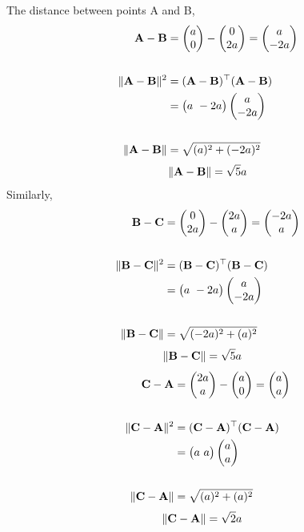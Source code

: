 \documentclass[journal,12pt,twocolumn]{IEEEtran}
\begin{document}
The distance between points A and B,
\vspace{0.3cm}
\begin{align*}
\mathbf{A} - \mathbf{B}&=\begin{pmatrix}a\\0\end{pmatrix}-\begin{pmatrix}0\\2a\end{pmatrix}=\begin{pmatrix}a\\-2a\end{pmatrix}\\\\
\lVert\mathbf{A}-\mathbf{B}\rVert^2 &=({\mathbf{A}-\mathbf{B}})^\top({\mathbf{A}-\mathbf{B}})\\
&= \begin{pmatrix}a \ -2a\end{pmatrix} \begin{pmatrix}a\\-2a\end{pmatrix}\\\\
\lVert\mathbf{A}-\mathbf{B}\rVert&=\sqrt{(a)^2+(-2a)^2}
\end{align*}
\begin{align}
 \lVert \mathbf{A}-\mathbf{B}\rVert=\sqrt{5}a   \label{Eq:1}
\end{align}
Similarly, 
\begin{align*}
\mathbf{B} - \mathbf{C}&=\begin{pmatrix}0\\2a\end{pmatrix}-\begin{pmatrix}2a\\a\end{pmatrix}=\begin{pmatrix}-2a\\a\end{pmatrix}\\\\
\lVert\mathbf{B}-\mathbf{C}\rVert^2&=({\mathbf{B}-\mathbf{C}})^\top({\mathbf{B}-\mathbf{C}})\\&= \begin{pmatrix}a \ -2a\end{pmatrix} \begin{pmatrix}a\\-2a\end{pmatrix}\\\\
\lVert\mathbf{B}-\mathbf{C}\rVert&=\sqrt{(-2a)^2+(a)^2}
\end{align*}
\begin{align}
    \lVert \mathbf{B} - \mathbf{C}\rVert&=\sqrt{5}a \label{Eq:2}
\end{align}
\begin{align*}
\mathbf{C} - \mathbf{A}&=\begin{pmatrix}2a\\a\end{pmatrix}-\begin{pmatrix}a\\0\end{pmatrix}=\begin{pmatrix}a\\a\end{pmatrix}\\\\
\lVert\mathbf{C}-\mathbf{A}\rVert^2&=({\mathbf{C}-\mathbf{A}})^\top({\mathbf{C}-\mathbf{A}})\\&= \begin{pmatrix}a \ a\end{pmatrix} \begin{pmatrix}a\\a\end{pmatrix}\\\\
\lVert\mathbf{C}-\mathbf{A}\rVert&=\sqrt{(a)^2+(a)^2}
\end{align*}
\begin{align}
\lVert \mathbf{C} - \mathbf{A}\rVert&=\sqrt{2}a     \label{Eq:3}
\end{align}
\end{document}
